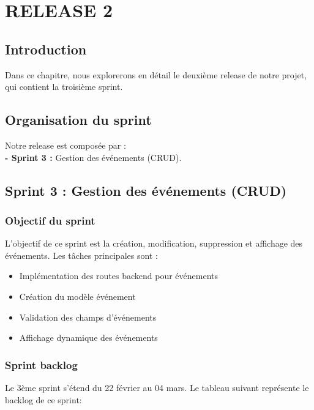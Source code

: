 \chapter{RELEASE 2}

\section*{Introduction}
Dans ce chapitre, nous explorerons en détail le deuxième release de notre projet, qui contient la troisième sprint.

\section{Organisation du sprint}
Notre release est composée par :\\
\textbf{- Sprint 3 :} Gestion des événements (CRUD).

\section{Sprint 3 : Gestion des événements (CRUD)}
\subsection{Objectif du sprint}
L'objectif de ce sprint est la création, modification, suppression et affichage des événements. Les tâches principales sont :
\begin{itemize}
    \item Implémentation des routes backend pour événements
    \item Création du modèle événement
    \item Validation des champs d'événements
    \item Affichage dynamique des événements
\end{itemize}

\subsection{Sprint backlog}
Le 3ème sprint s'étend du 22 février au 04 mars. Le tableau suivant représente le backlog de ce sprint:

